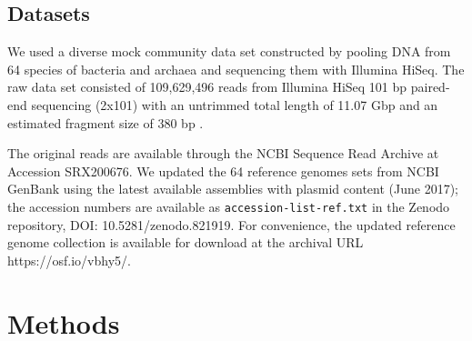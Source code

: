 \documentclass[11pt]{article}
\begin{document}



 

\subsection*{Datasets}

We used a diverse mock community data set constructed by pooling DNA
from 64 species of bacteria and archaea and sequencing them with
Illumina HiSeq.  The raw data set consisted of 109,629,496 reads from
Illumina HiSeq 101 bp paired-end sequencing (2x101) with an untrimmed
total length of 11.07 Gbp and an estimated fragment size of 380 bp
\cite{podar}.
 
The original reads are available through the NCBI Sequence Read
Archive at Accession SRX200676.  We updated the 64 reference genomes
sets from NCBI GenBank using the latest available assemblies with
plasmid content (June 2017); the accession numbers are available as
{\tt accession-list-ref.txt} in the Zenodo repository, DOI:
10.5281/zenodo.821919.
For convenience, the updated reference genome collection is
available for download at the archival URL https://osf.io/vbhy5/.

\section*{Methods}
\end{document}
